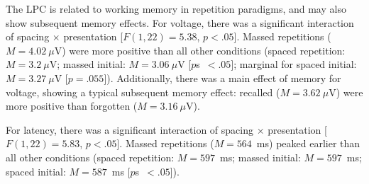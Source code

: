 

The LPC is related to working memory in repetition paradigms, and may also show subsequent memory effects.
For voltage, there was a significant interaction of spacing $\times$ presentation [$F(1,22)=5.38$, $p<.05$].  Massed repetitions ($M=4.02~\mu$V) were more positive than all other conditions (spaced repetition: $M=3.2~\mu$V; massed initial: $M=3.06~\mu$V [$p$s~$<.05$]; marginal for spaced initial: $M=3.27~\mu$V [$p=.055$]).  Additionally, there was a main effect of memory for voltage, showing a typical subsequent memory effect: recalled ($M=3.62~\mu$V) were more positive than forgotten ($M=3.16~\mu$V).

For latency, there was a significant interaction of spacing $\times$ presentation [$F(1,22)=5.83$, $p<.05$].  Massed repetitions ($M=564$~ms) peaked earlier than all other conditions (spaced repetition: $M=597$~ms; massed initial: $M=597$~ms; spaced initial: $M=587$~ms [$p$s~$<.05$]).    


